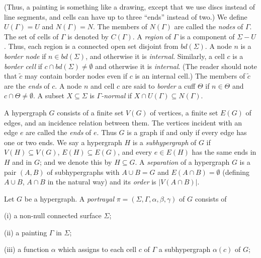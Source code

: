 \noindent (Thus, a painting is something like a drawing, except that we use discs instead of line segments, and cells can have up to three ``ends'' instead of two.) We define $U(\Gamma) = U$ and $N(\Gamma) = N$. The members of $N(\Gamma)$ are called the \textit{nodes} of $\Gamma$. The set of cells of $\Gamma$ is denoted by $C(\Gamma)$. A \textit{region} of $\Gamma$ is a component of $\Sigma - U$. Thus, each region is a connected open set disjoint from $bd(\Sigma)$. A node $n$ is a \textit{border node} if $n \in bd(\Sigma)$, and otherwise it is \textit{internal}. Similarly, a cell $c$ is a \textit{border cell} if $c \cap bd(\Sigma) \ne \emptyset$ and otherwise it is \textit{internal}. (The reader should note that $\tilde{c}$ may contain border nodes even if $c$ is an internal cell.) The members of $\tilde{c}$ are the \textit{ends} of $c$. A node $n$ and cell $c$ are said to \textit{border} a cuff $\Theta$ if $n \in \Theta$ and $c \cap \Theta \ne \emptyset$. A subset $X \subseteq \Sigma$ is \textit{$\Gamma$-normal} if $X \cap U(\Gamma) \subseteq N(\Gamma)$.


A hypergraph $G$ consists of a finite set $V(G)$ of vertices, a finite set $E(G)$ of edges, and an incidence relation between them. The vertices incident with an edge $e$ are called the \textit{ends} of $e$. Thus $G$ is a graph if and only if every edge has one or two ends. We say a hypergraph $H$ is a \textit{subhypergraph} of $G$ if $V(H) \subseteq V(G)$, $E(H) \subseteq E(G)$, and every $e \in E(H)$ has the same ends in $H$ and in $G$; and we denote this by $H \subseteq G$. A \textit{separation} of a hypergraph $G$ is a pair $(A, B)$ of subhypergraphs with $A \cup B = G$ and $E(A \cap B) = \emptyset$ (defining $A \cup B$, $A \cap B$ in the natural way) and its \textit{order} is $|V(A \cap B)|$.

Let $G$ be a hypergraph. A \textit{portrayal} $\pi = (\Sigma, \Gamma, \alpha, \beta, \gamma)$ of $G$ consists of

\hspace*{12pt}(i) a non-null connected surface $\Sigma$;

\hspace*{12pt}(ii) a painting $\Gamma$ in $\Sigma$;

\hspace*{12pt}(iii) a function $\alpha$ which assigns to each cell $c$ of $\Gamma$ a subhypergraph $\alpha(c)$ of $G$;

